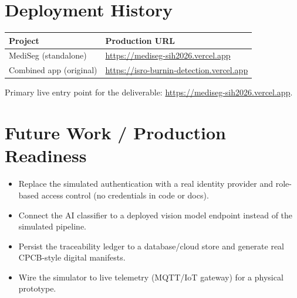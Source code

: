 \documentclass[11pt, a4paper]{article}
\begin{document}
\section{Deployment History}

\begin{tabularx}{\textwidth}{lX}
  \toprule
  \textbf{Project} & \textbf{Production URL}\\
  \midrule
  MediSeg (standalone) & \url{https://mediseg-sih2026.vercel.app}\\
  Combined app (original) & \url{https://isro-burnin-detection.vercel.app}\\
  \bottomrule
\end{tabularx}

Primary live entry point for the deliverable:
\url{https://mediseg-sih2026.vercel.app}.

\section{Future Work / Production Readiness}

\begin{itemize}[leftmargin=1.6em, itemsep=2pt]
  \item Replace the simulated authentication with a real identity provider and
        role-based access control (no credentials in code or docs).
  \item Connect the AI classifier to a deployed vision model endpoint instead
        of the simulated pipeline.
  \item Persist the traceability ledger to a database/cloud store and generate
        real CPCB-style digital manifests.
  \item Wire the simulator to live telemetry (MQTT/IoT gateway) for a physical
        prototype.
\end{itemize}
\end{document}

